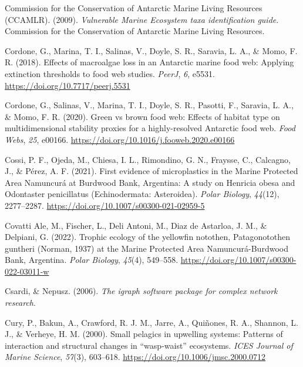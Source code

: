 \documentclass[preprint, 3p,
authoryear]{elsarticle} %
\newlength{\cslhangindent}
\newlength{\cslentryspacingunit} %
\newenvironment{CSLReferences}[2] %
 {%
  \setlength{\parindent}{0pt}
  \ifodd #1
  \let\oldpar\par
  \def\par{\hangindent=\cslhangindent\oldpar}
  \fi
  \setlength{\parskip}{#2\cslentryspacingunit}
 }%
 {}
\begin{document}
\begin{CSLReferences}{1}{0}
\leavevmode{}%
Commission for the Conservation of Antarctic Marine Living Resources
(CCAMLR). (2009). \emph{Vulnerable {Marine Ecosystem} taxa
identification guide}. {Commission for the Conservation of Antarctic
Marine Living Resources}.

\leavevmode{}%
Cordone, G., Marina, T. I., Salinas, V., Doyle, S. R., Saravia, L. A.,
\& Momo, F. R. (2018). Effects of macroalgae loss in an {Antarctic}
marine food web: Applying extinction thresholds to food web studies.
\emph{PeerJ}, \emph{6}, e5531. \url{https://doi.org/10.7717/peerj.5531}

\leavevmode{}%
Cordone, G., Salinas, V., Marina, T. I., Doyle, S. R., Pasotti, F.,
Saravia, L. A., \& Momo, F. R. (2020). Green vs brown food web:
{Effects} of habitat type on multidimensional stability proxies for a
highly-resolved {Antarctic} food web. \emph{Food Webs}, \emph{25},
e00166. \url{https://doi.org/10.1016/j.fooweb.2020.e00166}

\leavevmode{}%
Cossi, P. F., Ojeda, M., Chiesa, I. L., Rimondino, G. N., Fraysse, C.,
Calcagno, J., \& Pérez, A. F. (2021). First evidence of microplastics in
the {Marine Protected Area Namuncurá} at {Burdwood Bank}, {Argentina}: A
study on {Henricia} obesa and {Odontaster} penicillatus
({Echinodermata}: {Asteroidea}). \emph{Polar Biology}, \emph{44}(12),
2277--2287. \url{https://doi.org/10.1007/s00300-021-02959-5}

\leavevmode{}%
Covatti Ale, M., Fischer, L., Deli Antoni, M., Diaz de Astarloa, J. M.,
\& Delpiani, G. (2022). Trophic ecology of the yellowfin notothen,
{Patagonotothen} guntheri ({Norman}, 1937) at the {Marine Protected Area
Namuncurá-Burdwood Bank}, {Argentina}. \emph{Polar Biology},
\emph{45}(4), 549--558. \url{https://doi.org/10.1007/s00300-022-03011-w}

\leavevmode{}%
Csardi, \& Nepusz. (2006). \emph{The igraph software package for complex
network research}.

\leavevmode{}%
Cury, P., Bakun, A., Crawford, R. J. M., Jarre, A., Quiñones, R. A.,
Shannon, L. J., \& Verheye, H. M. (2000). Small pelagics in upwelling
systems: Patterns of interaction and structural changes in
{``wasp-waist''} ecosystems. \emph{ICES Journal of Marine Science},
\emph{57}(3), 603--618. \url{https://doi.org/10.1006/jmsc.2000.0712}


\end{CSLReferences}
\end{document}
